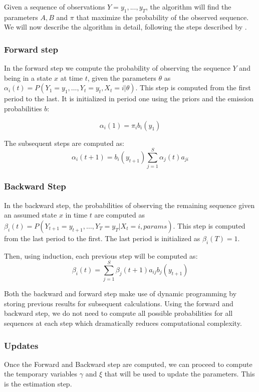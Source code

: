 \documentclass[12pt, authoryear]{elsarticle}
\begin{document}
Given a sequence of observations $Y = {y_{1},...,y_{T}}$, the algorithm will find the parameters $ A, B$ and $\pi$ that maximize the probability of the observed sequence. We will now describe the algorithm in detail, following the steps described by \cite{rabiner1989tutorial}.

\subsubsection{Forward step}

In the forward step we compute the probability of observing the sequence $Y$ and being in a state $x$ at time $t$, given the parameters $\theta$ as $\alpha_{i}(t)=P\left(Y_{1}=y_{1}, \ldots, Y_{t}=y_{t}, X_{t}=i |\theta \right)$. This step is computed from the first period to the last. It is initialized in period one using the priors and the emission probabilities $b$:

$$  \alpha_{i}(1)=\pi_{i} b_{i}\left(y_{1}\right) $$

The subsequent steps are computed as:
$$  \alpha_{i}(t+1)=b_{i}\left(y_{t+1}\right) \sum_{j=1}^{S} \alpha_{j}(t) a_{j i} $$

\subsubsection{Backward Step}

In the backward step, the probabilities of observing the remaining sequence given an assumed state $x$ in time $t$ are computed as $\beta_{i}(t)=P\left(Y_{t+1}=y_{t+1}, \ldots, Y_{T}=y_{T} | X_{t}=i, params\right)$. This step is computed from the last period to the first. The last period is initialized as $\beta_{i}(T)=1$.

Then, using induction, each previous step will be computed as: 
$$ 
\beta_{i}(t)=\sum_{j=1}^{S} \beta_{j}(t+1) a_{i j} b_{j}\left(y_{t+1}\right)
$$

Both the backward and forward step make use of dynamic programming by storing previous results for subsequent calculations. Using the forward and backward step, we do not need to compute all possible probabilities for all sequences at each step which dramatically reduces computational complexity.

\subsubsection{Updates}
Once the Forward and Backward step are computed, we can proceed to compute the temporary variables $\gamma$ and $\xi$ that will be used to update the parameters. This is the estimation step.
\end{document}
